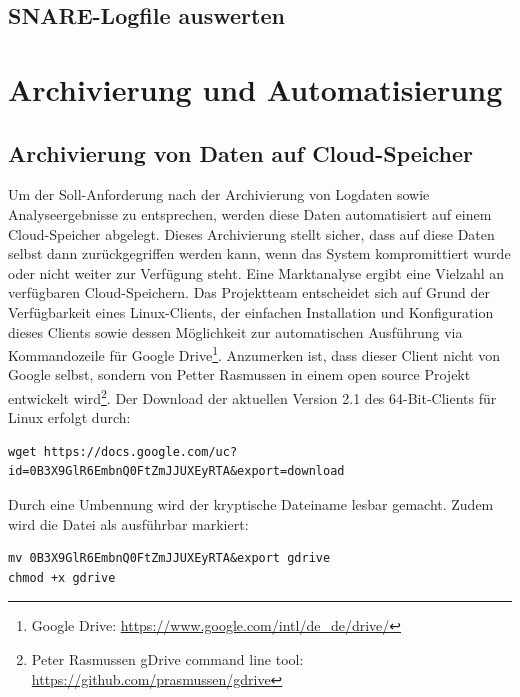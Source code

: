 \subsection{SNARE-Logfile auswerten}
\label{subsec:Installation und Konfiguration SNARE}



\section{Archivierung und Automatisierung}
\label{sec:Archivierung und Automatisierung}


\subsection{Archivierung von Daten auf Cloud-Speicher}
\label{subsec:Archivierung von Daten auf Cloud-Speicher}

Um der Soll-Anforderung nach der Archivierung von Logdaten sowie Analyseergebnisse zu entsprechen, werden diese Daten automatisiert auf einem Cloud-Speicher abgelegt. Dieses Archivierung stellt sicher, dass auf diese Daten selbst dann zurückgegriffen werden kann, wenn das System kompromittiert wurde oder nicht weiter zur Verfügung steht. Eine Marktanalyse ergibt eine Vielzahl an verfügbaren Cloud-Speichern. Das Projektteam entscheidet sich auf Grund der Verfügbarkeit eines Linux-Clients, der einfachen Installation und Konfiguration dieses Clients sowie dessen Möglichkeit zur automatischen Ausführung via Kommandozeile für Google Drive\footnote{ Google Drive: \url{https://www.google.com/intl/de_de/drive/}}. Anzumerken ist, dass dieser Client nicht von Google selbst, sondern von Petter Rasmussen in einem open source Projekt entwickelt wird\footnote{ Peter Rasmussen gDrive command line tool: \url{https://github.com/prasmussen/gdrive}}. Der Download der aktuellen Version 2.1 des 64-Bit-Clients für Linux erfolgt durch:

\begin{lstlisting}[style=customc]
wget https://docs.google.com/uc?id=0B3X9GlR6EmbnQ0FtZmJJUXEyRTA&export=download
\end{lstlisting}

Durch eine Umbennung wird der kryptische Dateiname lesbar gemacht. Zudem wird die Datei als ausführbar markiert:

\begin{lstlisting}[style=customc]
mv 0B3X9GlR6EmbnQ0FtZmJJUXEyRTA&export gdrive
chmod +x gdrive
\end{lstlisting}

